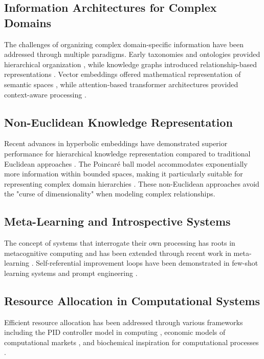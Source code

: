 \documentclass[journal,onecolumn]{IEEEtran}
\begin{document}
\subsection{Information Architectures for Complex Domains}

The challenges of organizing complex domain-specific information have been addressed through multiple paradigms. Early taxonomies and ontologies provided hierarchical organization \cite{noy2001ontology}, while knowledge graphs introduced relationship-based representations \cite{miller1995wordnet}. Vector embeddings offered mathematical representation of semantic spaces \cite{mikolov2013distributed}, while attention-based transformer architectures provided context-aware processing \cite{vaswani2017attention}.

\subsection{Non-Euclidean Knowledge Representation}

Recent advances in hyperbolic embeddings have demonstrated superior performance for hierarchical knowledge representation compared to traditional Euclidean approaches \cite{nickel2017poincare}. The Poincaré ball model accommodates exponentially more information within bounded spaces, making it particularly suitable for representing complex domain hierarchies \cite{nickel2018learning}. These non-Euclidean approaches avoid the "curse of dimensionality" when modeling complex relationships.

\subsection{Meta-Learning and Introspective Systems}

The concept of systems that interrogate their own processing has roots in metacognitive computing \cite{cox2011metareasoning} and has been extended through recent work in meta-learning \cite{finn2017model}. Self-referential improvement loops have been demonstrated in few-shot learning systems \cite{hospedales2020meta} and prompt engineering \cite{zhou2022large}.

\subsection{Resource Allocation in Computational Systems}

Efficient resource allocation has been addressed through various frameworks including the PID controller model in computing \cite{hellerstein2004feedback}, economic models of computational markets \cite{clearwater1996market}, and biochemical inspiration for computational processes \cite{dittrich2001artificial}.
\end{document}

